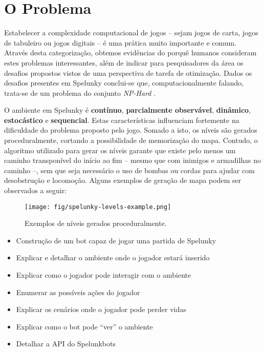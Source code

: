\chapter{\label{chap:problem}O Problema}
Estabelecer a complexidade computacional de jogos -- sejam jogos de carta,
jogos de tabuleiro ou jogos digitais -- é uma prática muito importante e comum.
Através desta categorização, obtemos evidências do porquê humanos consideram
estes problemas interessantes, além de indicar para pesquisadores da área os
desafios propostos vistos de uma perspectiva de tarefa de otimização.  Dados os
desafios presentes em Spelunky conclui-se que, computacionalmente falando,
trata-se de um problema do conjunto \textit{NP-Hard}
\cite{SPELUNKYHARD}.

O ambiente em Spelunky é \textbf{contínuo}, \textbf{parcialmente observável},
\textbf{dinâmico}, \textbf{estocástico} e \textbf{sequencial}. Estas
características influenciam fortemente na dificuldade do problema proposto pelo
jogo. Somado a isto, os níveis são gerados proceduralmente, cortando a
possibilidade de memorização do mapa. Contudo, o algoritmo utilizado para gerar
os níveis garante que existe pelo menos um caminho transponível do início ao fim
-- mesmo que com inimigos e armadilhas no caminho --, sem que seja necessário o
uso de bombas ou cordas para ajudar com desobstrução e locomoção. Alguns
exemplos de geração de mapa podem ser observados a seguir:

\begin{figure}[htb!]
\centering\texttt{[image: fig/spelunky-levels-example.png]}
\caption {\label{fig:spelunkbots-debug-screen}Exemplos de níveis gerados
proceduralmente.} \end{figure}


\begin{itemize}
    \item Construção de um bot capaz de jogar uma partida de Spelunky
    \item Explicar e detalhar o ambiente onde o jogador estará inserido
    \item Explicar como o jogador pode interagir com o ambiente
    \item Enumerar as possíveis ações do jogador
    \item Explicar os cenários onde o jogador pode perder vidas
    \item Explicar como o bot pode ``ver'' o ambiente
    \item Detalhar a API do Spelunkbots
\end{itemize}
